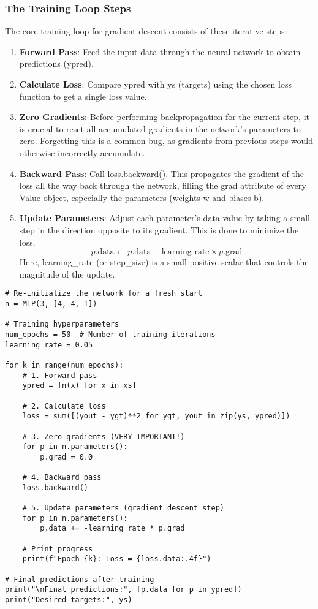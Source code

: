 \subsubsection{The Training Loop Steps} 
The core training loop for gradient descent consists of these iterative steps:

\begin{enumerate} 
\item \textbf{Forward Pass}: Feed the input data through the neural network to obtain predictions (ypred). 
\item \textbf{Calculate Loss}: Compare ypred with ys (targets) using the chosen loss function to get a single loss value. 
\item \textbf{Zero Gradients}: Before performing backpropagation for the current step, it is crucial to reset all accumulated gradients in the network's parameters to zero. Forgetting this is a common bug, as gradients from previous steps would otherwise incorrectly accumulate. 
\item \textbf{Backward Pass}: Call loss.backward(). This propagates the gradient of the loss all the way back through the network, filling the grad attribute of every Value object, especially the parameters (weights w and biases b). 
\item \textbf{Update Parameters}: Adjust each parameter's data value by taking a small step in the direction opposite to its gradient. This is done to minimize the loss. 
$$ p.\text{data} \leftarrow p.\text{data} - \text{learning\_rate} \times p.\text{grad} $$ 
Here, learning\_rate (or step\_size) is a small positive scalar that controls the magnitude of the update. 
\end{enumerate}

\begin{lstlisting}[caption={Full Training Loop Example}]
# Re-initialize the network for a fresh start
n = MLP(3, [4, 4, 1])

# Training hyperparameters
num_epochs = 50  # Number of training iterations 
learning_rate = 0.05

for k in range(num_epochs): 
    # 1. Forward pass 
    ypred = [n(x) for x in xs]

    # 2. Calculate loss
    loss = sum([(yout - ygt)**2 for ygt, yout in zip(ys, ypred)])

    # 3. Zero gradients (VERY IMPORTANT!)
    for p in n.parameters():
        p.grad = 0.0

    # 4. Backward pass
    loss.backward()

    # 5. Update parameters (gradient descent step)
    for p in n.parameters():
        p.data += -learning_rate * p.grad

    # Print progress
    print(f"Epoch {k}: Loss = {loss.data:.4f}")

# Final predictions after training
print("\nFinal predictions:", [p.data for p in ypred]) 
print("Desired targets:", ys) 
\end{lstlisting}

